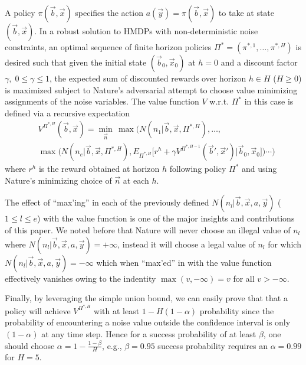 A policy $\pi(\vec{b},\vec{x})$ specifies the action $a(\vec{y}) =
\pi(\vec{b},\vec{x})$ to take at state $(\vec{b},\vec{x})$.  
In a robust solution to HMDPs with non-deterministic noise constraints, 
an optimal sequence of finite horizon policies $\Pi^* = (\pi^{*,1},\ldots,\pi^{*,H})$ is desired such that given the initial state $(\vec{b}_0,\vec{x}_0)$ at $h=0$ and  a discount factor $\gamma, \; 0 \leq \gamma \leq 1$, the expected sum of discounted rewards over horizon $h \in H$ ($H \geq 0$) is maximized subject to Nature's
adversarial attempt to choose value minimizing assignments of the noise variables.  The
value function $V$ w.r.t. $\Pi^*$ in this case is defined via a recursive expectation
{\footnotesize
\begin{align*} 
& V^{\Pi^{*,H}}(\vec{b},\vec{x}) = \min_{\vec{n}} \, \max\!\Big(N(n_1|\vec{b},\vec{x},\Pi^{*,H}),\ldots,\\
& \max\!\Big(N(n_e|\vec{b},\vec{x},\Pi^{*,H}), E_{\Pi^{*,H}} \Big[ r^h \!\! + \! \gamma V^{\Pi^{*,H-1}} \! \! (\vec{b}',\!\vec{x}') \Big| \vec{b}_0,\!\vec{x}_0\Big] \Big) \!\! \cdots \!\! \Big)
\end{align*}}                   
where $r^h$ is the reward obtained at horizon $h$ following policy $\Pi^*$ and using
Nature's minimizing choice of $\vec{n}$ at each $h$.

The effect of ``max'ing'' in each of the previously defined
$N(n_l| \vec{b},\vec{x},a,\vec{y})$ ($1 \leq l \leq e$) with the value
function is one of the major insights and contributions of this paper.
We noted before that Nature will never choose an illegal value of
$n_l$ where $N(n_l| \vec{b},\vec{x},a,\vec{y}) = +\infty$, instead it
will choose a legal value of $n_l$ for which
$N(n_l| \vec{b},\vec{x},a,\vec{y}) = -\infty$ which when ``max'ed'' in
with the value function effectively vanishes owing to the indentity
$\max(v,-\infty) = v$ for all $v > -\infty$.

Finally, by leveraging the simple union bound, we can easily prove that
that a policy will achieve $V^{\Pi^{*,H}}$ with at least $1 - H(1-\alpha)$
probability since the probability of encountering a noise value
outside the confidence interval is only $(1-\alpha)$ at any time step.
Hence for a success probability of at least $\beta$, one should choose
$\alpha = 1 - \frac{1 - \beta}{H}$, e.g., $\beta = 0.95$ success probability
requires an $\alpha = 0.99$ for $H=5$.

